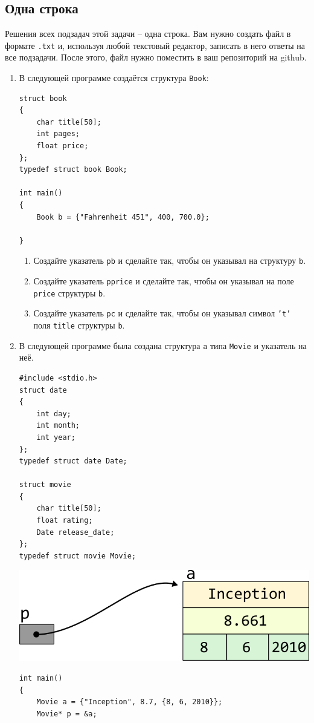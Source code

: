 \documentclass[10pt]{article}
\begin{document}
\newpage
\subsection{Одна строка}
Решения всех подзадач этой задачи -- одна строка. Вам нужно создать файл в формате \texttt{.txt} и, используя любой текстовый редактор, записать в него ответы на все подзадачи. После этого, файл нужно поместить в ваш репозиторий на github.

\begin{enumerate}

\item В следующей программе создаётся структура \texttt{Book}:
\begin{lstlisting}
struct book 
{
    char title[50];
    int pages;
    float price;
};
typedef struct book Book;

int main() 
{
    Book b = {"Fahrenheit 451", 400, 700.0};
    
}
\end{lstlisting}
\begin{enumerate}
\item Создайте указатель \texttt{pb} и сделайте так, чтобы он указывал на структуру \texttt{b}.
\item Создайте указатель \texttt{pprice} и сделайте так, чтобы он указывал на поле \texttt{price} структуры \texttt{b}.
\item Создайте указатель \texttt{pc} и сделайте так, чтобы он указывал символ \texttt{'t'} поля \texttt{title} структуры \texttt{b}.
\end{enumerate}



\item В следующей программе была создана структура \texttt{a} типа \texttt{Movie} и указатель на неё.
\begin{multicols}{2}
\begin{lstlisting}
#include <stdio.h>
struct date 
{
    int day; 
    int month;
    int year;
};
typedef struct date Date;

struct movie 
{
    char title[50];
    float rating;
    Date release_date;
};
typedef struct movie Movie;
\end{lstlisting}
\vfill \null  
\columnbreak
\vfill \null  
\begin{center}
\includegraphics[scale=1]{../images/pointer_schemes/pointer_to_struct_movie.png}
\end{center}
\end{multicols}
\vspace{-10ex}
\begin{lstlisting}
int main() 
{
    Movie a = {"Inception", 8.7, {8, 6, 2010}};
    Movie* p = &a;
    

\end{lstlisting}
\end{enumerate}
\end{document}
